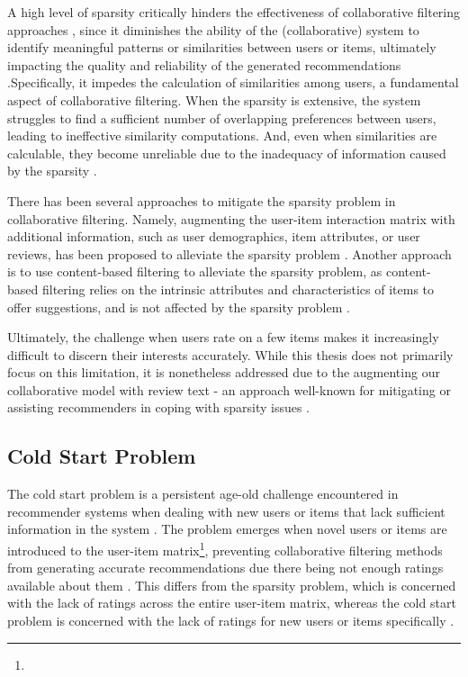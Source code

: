 A high level of sparsity critically hinders the effectiveness of collaborative filtering approaches \cite{da2018effects}, since it diminishes the ability of the (collaborative) system to identify meaningful patterns or similarities between users or items, ultimately impacting the quality and reliability of the generated recommendations \cite{burke2015robust}.Specifically, it impedes the calculation of similarities among users, a fundamental aspect of collaborative filtering. When the sparsity is extensive, the system struggles to find a sufficient number of overlapping preferences between users, leading to ineffective similarity computations. And, even when similarities are calculable, they become unreliable due to the inadequacy of information caused by the sparsity \cite{da2018effects}.

There has been several approaches to mitigate the sparsity problem in collaborative filtering. Namely, augmenting the user-item interaction matrix with additional information, such as user demographics, item attributes, or user reviews, has been proposed to alleviate the sparsity problem \cite{srifi2020recommender}. Another approach is to use content-based filtering to alleviate the sparsity problem, as content-based filtering relies on the intrinsic attributes and characteristics of items to offer suggestions, and is not affected by the sparsity problem \cite{lops2011content}.

Ultimately, the challenge when users rate on a few items makes it increasingly difficult to discern their interests accurately. While this thesis does not primarily focus on this limitation, it is nonetheless addressed due to the augmenting our collaborative model with review text - an approach well-known for mitigating or assisting recommenders in coping with sparsity issues \cite{srifi2020recommender}.


\subsection{Cold Start Problem}
\label{subsec:2 Cold Start Problem}

The cold start problem is a persistent age-old challenge encountered in recommender systems when dealing with new users or items that lack sufficient information in the system \cite{lika2014facing}. The problem emerges when novel users or items are introduced to the user-item matrix\footnote{}, preventing collaborative filtering methods from generating accurate recommendations due there being not enough ratings available about them \cite{huang2004applying}. This differs from the sparsity problem, which is concerned with the lack of ratings across the entire user-item matrix, whereas the cold start problem is concerned with the lack of ratings for new users or items specifically \cite{lika2014facing}. 

